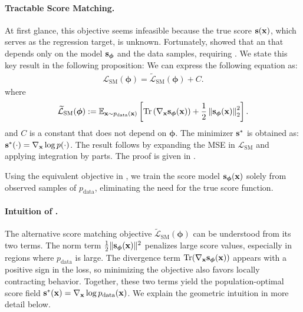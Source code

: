 \paragraph{Tractable Score Matching.}
At first glance, this objective seems infeasible because the true score ${\mathbf{s}}({\mathbf{x}})$, which serves as the regression target, is unknown.  
Fortunately, \citet{hyvarinen2005estimation} showed that  an  that depends only on the model ${\mathbf{s}}_{\bm{\phi}}$ and the data samples,  requiring .  
We state this key result in the following proposition: 
        {
        We can express the following equation as:
        \begin{align*}
            \mathcal{L}_{\text{SM}}(\bm{\phi}) = \widetilde{\mathcal{L}}_{\text{SM}}(\bm{\phi}) + C.
        \end{align*}
        where
        \begin{align}\label{eq:sm-alternative}
            \widetilde{\mathcal{L}}_{\text{SM}}(\bm{\phi})
            := \mathbb{E}_{{\mathbf{x}} \sim p_{\text{data}}({\mathbf{x}})} \left[
            \operatorname{Tr}\left(\nabla_{{\mathbf{x}}}{\mathbf{s}}_{\bm{\phi}}({\mathbf{x}})\right)
            + \frac{1}{2} \left\lVert{\mathbf{s}}_{\bm{\phi}}({\mathbf{x}})\right\rVert_2^2
            \right].
        \end{align}
        and $C$ is a constant that does not depend on $\bm{\phi}$. The minimizer ${\mathbf{s}}^*$ is obtained as: ${\mathbf{s}}^*(\cdot) = \nabla_{{\mathbf{x}}} \log p(\cdot)$.
        }
        {The result follows by expanding the MSE in $ \mathcal{L}_{\text{SM}} $ and applying integration by parts. The proof is given in . 
        }

Using the equivalent objective in , we train the score model ${\mathbf{s}}_{\bm{\phi}}({\mathbf{x}})$ solely from observed samples of $p_{\mathrm{data}}$, eliminating the need for the true score function.


\paragraph{Intuition of .}
The alternative score matching objective $\widetilde{\mathcal{L}}_{\text{SM}}(\bm\phi)$
can be understood from its two terms.
The norm term $\tfrac12\|{\mathbf{s}}_{\bm\phi}({\mathbf{x}})\|^2$ penalizes large score values,
especially in regions where $p_{\mathrm{data}}$ is large.
The divergence term $\operatorname{Tr}(\nabla_{{\mathbf{x}}} {\mathbf{s}}_{\bm\phi}({\mathbf{x}}))$ appears with a positive sign in the loss, so minimizing the objective also favors locally contracting behavior.
Together, these two terms yield the population-optimal score field
${\mathbf{s}}^*({\mathbf{x}})=\nabla_{{\mathbf{x}}}\log p_{\mathrm{data}}({\mathbf{x}})$.
We explain the geometric intuition in more detail below.

